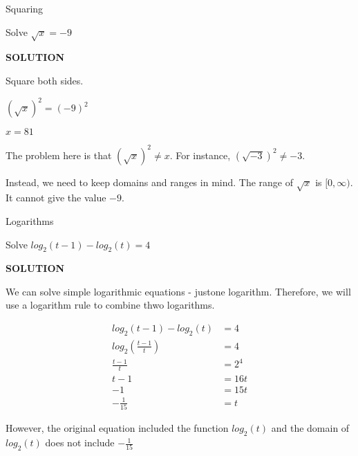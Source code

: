 \documentclass{ximera}
\begin{document}
\begin{example} Squaring


Solve $\sqrt{x} = -9$

\textbf{\textcolor{purple!50!blue!90!black}{SOLUTION}}

Square both sides.


$(\sqrt{x})^2 = (-9)^2$

$x = 81$



The problem here is that  $(\sqrt{x})^2 \ne x$.  For instance, $(\sqrt{-3})^2 \ne -3$.


Instead, we need to keep domains and ranges in mind.  The range of $\sqrt{x}$ is $[0, \infty)$. It cannot give the value $-9$.



\end{example}









\begin{example} Logarithms


Solve $log_2(t-1) - log_2(t) = 4$

\textbf{\textcolor{purple!50!blue!90!black}{SOLUTION}}


We can solve simple logarithmic equations - justone logarithm.  Therefore, we will use a logarithm rule to combine thwo logarithms.



\[
\begin{array}{rl}
log_2(t-1) - log_2(t) & = 4   \\

log_2 \left( \frac{t-1}{t} \right)  & = 4  \\

\frac{t-1}{t} & = 2^4  \\

 t-1 & = 16t  \\

-1 & = 15t  \\

-\frac{1}{15} & = t

\end{array}
\]


However, the original equation included the function $log_2(t)$ and the domain of $log_2(t)$ does not include $-\frac{1}{15}$




\end{example}
\end{document}
